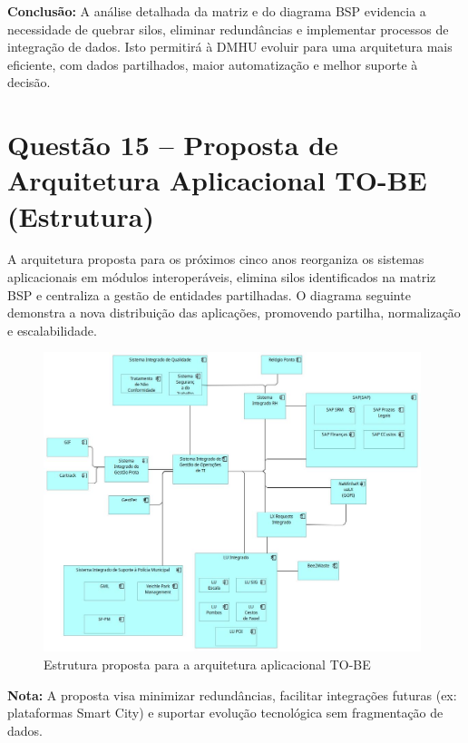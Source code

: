 \documentclass[12pt,a4paper,final]{article}
\begin{document}
    \textbf{Conclusão:}
    A análise detalhada da matriz e do diagrama BSP evidencia a necessidade de quebrar silos, eliminar redundâncias e implementar processos de integração de dados. Isto permitirá à DMHU evoluir para uma arquitetura mais eficiente, com dados partilhados, maior automatização e melhor suporte à decisão.


    \section*{Questão 15 – Proposta de Arquitetura Aplicacional TO-BE (Estrutura)}

    A arquitetura proposta para os próximos cinco anos reorganiza os sistemas aplicacionais em módulos interoperáveis, elimina silos identificados na matriz BSP e centraliza a gestão de entidades partilhadas. O diagrama seguinte demonstra a nova distribuição das aplicações, promovendo partilha, normalização e escalabilidade.

    \begin{figure}[H]
        \centering
        \includegraphics[width=0.98\textwidth]{Q15 - Application Structure.jpg}
        \caption{Estrutura proposta para a arquitetura aplicacional TO-BE}
        \label{fig:q15-app-structure-tobe}
    \end{figure}

    \textbf{Nota:} A proposta visa minimizar redundâncias, facilitar integrações futuras (ex: plataformas Smart City) e suportar evolução tecnológica sem fragmentação de dados.
\end{document}
